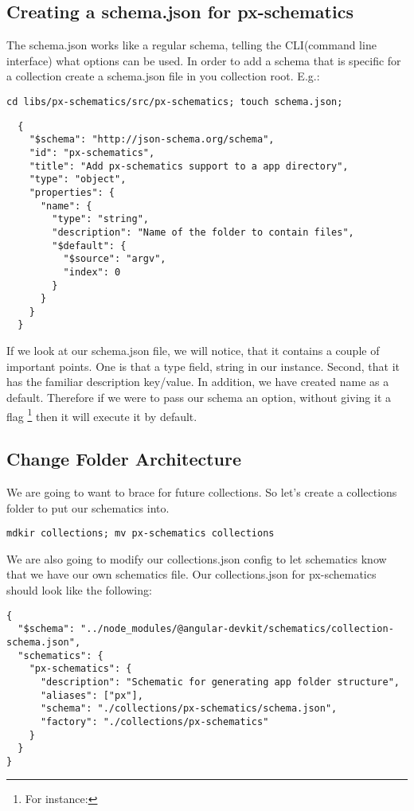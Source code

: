\subsection{ Creating a schema.json for px-schematics }
The schema.json works like a regular schema, telling the CLI(command line
interface) what options can be used. In order to add a schema that is specific
for a collection create a schema.json file in you collection root. E.g.:
\begin{verbatim}
cd libs/px-schematics/src/px-schematics; touch schema.json;
\end{verbatim}

\begin{lstlisting}
  {
    "$schema": "http://json-schema.org/schema",
    "id": "px-schematics",
    "title": "Add px-schematics support to a app directory",
    "type": "object",
    "properties": {
      "name": {
        "type": "string",
        "description": "Name of the folder to contain files",
        "$default": {
          "$source": "argv",
          "index": 0
        }
      }
    }
  }
\end{lstlisting}
If we look at our schema.json file, we will notice, that it contains a couple
of important points. One is that a type field, string in our instance. Second,
that it has the familiar description key/value. In addition, we have created
name as a default. Therefore if we were to pass our schema an option, without
giving it a flag \footnote{For instance: }
then it will execute it by default.

\subsection{ Change Folder Architecture }
We are going to want to brace for future collections. So let's create a
collections folder to put our schematics into.
\begin{verbatim}
mdkir collections; mv px-schematics collections
\end{verbatim}

We are also going to modify our collections.json config to let schematics know
that we have our own schematics file. Our collections.json for px-schematics
should look like the following:

\begin{lstlisting}
{
  "$schema": "../node_modules/@angular-devkit/schematics/collection-schema.json",
  "schematics": {
    "px-schematics": {
      "description": "Schematic for generating app folder structure",
      "aliases": ["px"],
      "schema": "./collections/px-schematics/schema.json",
      "factory": "./collections/px-schematics"
    }
  }
}
\end{lstlisting}
